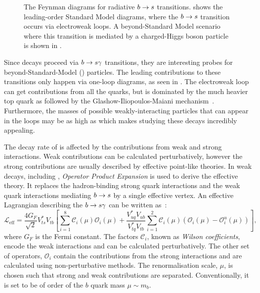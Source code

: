 
\begin{figure}[htbp!]
\resizebox{0.66\textwidth}{!}{
    \subcaptionbox{\label{fig:sm_diagrams}}{
        
        
    }
}
\resizebox{0.33\textwidth}{!}{
\subcaptionbox{\label{fig:bsm_diagrams}}{
    
}
}
\caption{\label{fig:b_to_s_gamma_diagrams}
The Feynman diagrams for radiative $b\rightarrow s$ transitions. 
 shows the leading-order Standard Model diagrams, where the $b\rightarrow s$ transition occurs via electroweak loops.
A beyond-Standard Model scenario where this transition is mediated by a charged-Higgs boson particle is shown in .
}
\end{figure}

Since \BtoXsdgamma decays proceed via $b\rightarrow s\gamma$ transitions, they are interesting probes for beyond-Standard-Model (\BSM) particles. 
The leading contributions to these transitions only happen via one-loop diagrams, as seen in .
The electroweak loop can get contributions from all the quarks, but is dominated by the much heavier top quark \cite{Mannel:2001vn} as followed by the Glashow-Iliopoulos-Maiani mechanism~\cite{Glashow:1970gm}. 
Furthermore, the masses of possible \BSM weakly-interacting particles that can appear in the loops may be as high as  \cite{Misiak:2020vlo} which makes studying these decays incredibly appealing.

The decay rate of \BtoXsdgamma is affected by the contributions from weak and strong interactions.
Weak contributions can be calculated perturbatively, however the strong contributions are usually described by effective point-like theories.
In weak decays, including \BtoXsgamma, \textit{Operator Product Expansion} \cite{Peskin:1995ev,Buras:1998raa} is used to derive the effective theory.
It replaces the hadron-binding strong quark interactions and the weak quark interactions mediating $b\rightarrow s$ by a single effective vertex.
An effective Lagrangian describing the $b\rightarrow s\gamma$ can be written as~\cite{Kaminski:2012eb,Misiak:2015xwa}:
\begin{equation}\label{eq:effective_lagrangian}
    \mathcal{L}_{\mathrm{eff}} = \frac{4G_F}{\sqrt{2}}V_{ts}^*V_{tb}\left[\sum^{8}_{i=1}\mathcal{C}_i(\mu)\mathcal{O}_i(\mu)
                                                + \frac{V^*_{uq}V_{ub}}{V^*_{tq}V_{tb}}\sum^{2}_{i=1}\mathcal{C}_i(\mu)(\mathcal{O}_i(\mu)-\mathcal{O}_i^u(\mu))\right],
\end{equation}
where $G_F$ is the Fermi constant.
The factors $\mathcal{C}_i$, known as \textit{Wilson coefficients}, encode the weak interactions and can be calculated perturbatively.
The other set of operators, $\mathcal{O}_i$ contain the contributions from the strong interactions and are calculated using non-perturbative methods.
The renormalisation scale, $\mu$, is chosen such that strong and weak contributions are separated.
Conventionally, it is set to be of order of the $b$ quark mass $\mu\sim m_b$.

